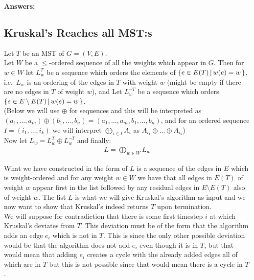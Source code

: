 \documentclass[nobib]{tufte-handout}
\newcommand{\bigset}[3][1]{%
    \ifthenelse{1=#1}{%
        \left\{#2 \left| \, #3 \right.\right\}
    }{%
        \left\{#2\right\}
    }
}
\begin{document}
\textbf{Answers:} \\ 
 \subsection{Kruskal's Reaches all MST:s}
            Let $T$ be an MST of $G = (V, E)$. \\
            
            Let $W$ be a $\leq$-ordered sequence of all the weights which appear in $G$. Then for $w \in W$ let $L_w^T$ be a sequence which orders the elements of $\bigset[1]{e \in E(T)}{w(e) = w}$, i.e.\ $L_w$ is an ordering of the edges in $T$ with weight $w$ (might be empty if there are no edges in $T$ of weight $w$), and Let $L_w^{\neg T}$ be a sequence which orders $\bigset[1]{e \in E \setminus E(T)}{w(e) = w}$. \\
            
            (Below we will use $\oplus$ for sequences and this will be interpreted as $(a_1, \ldots, a_m) \oplus (b_1, \ldots, b_n) = (a_1, \ldots, a_m, b_1, \ldots, b_n)$, and for an ordered sequence $I = (i_1, \ldots, i_k)$ we will interpret $\bigoplus\limits_{i \in I} A_i$ as $A_{i_1} \oplus \ldots \oplus A_{i_k}$) \\
            
            Now let $L_w = L_w^T \oplus L_w^{\neg T}$ and finally:
%
            \begin{align*}
                L = \bigoplus_{w \in W} L_w
            \end{align*}

            What we have constructed in the form of $L$ is a sequence of the edges in $E$ which is weight-ordered and for any weight $w \in W$ we have that all edges in $E(T)$ of weight $w$ appear first in the list followed by any residual edges in $E \setminus E(T)$ also of weight $w$. The list $L$ is what we will give Kruskal's algorithm as input and we now want to show that Kruskal's indeed returns $T$ upon termination. \\

            We will suppose for contradiction that there is some first timestep $i$ at which Kruskal's deviates from $T$. This deviation must be of the form that the algorithm adds an edge $e_i$ which is not in $T$. This is since the only other possible deviation would be that the algorithm does not add $e_i$ even though it is in $T$, but that would mean that adding $e_i$ creates a cycle with the already added edges all of which are in $T$ but this is not possible since that would mean there is a cycle in $T$. \\
\end{document}
